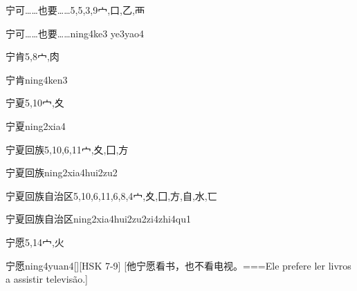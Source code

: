 \begin{Entry}{宁可……也要……}{5,5,3,9}{⼧,⼝,⼄,⾑}
  \begin{Phonetics}{宁可……也要……}{ning4ke3 ye3yao4}
  \end{Phonetics}
\end{Entry}

\begin{Entry}{宁肯}{5,8}{⼧,⾁}
  \begin{Phonetics}{宁肯}{ning4ken3}
  \end{Phonetics}
\end{Entry}

\begin{Entry}{宁夏}{5,10}{⼧,⼢}
  \begin{Phonetics}{宁夏}{ning2xia4}
  \end{Phonetics}
\end{Entry}

\begin{Entry}{宁夏回族}{5,10,6,11}{⼧,⼢,⼞,⽅}
  \begin{Phonetics}{宁夏回族}{ning2xia4hui2zu2}
  \end{Phonetics}
\end{Entry}

\begin{Entry}{宁夏回族自治区}{5,10,6,11,6,8,4}{⼧,⼢,⼞,⽅,⾃,⽔,⼖}
  \begin{Phonetics}{宁夏回族自治区}{ning2xia4hui2zu2zi4zhi4qu1}
  \end{Phonetics}
\end{Entry}

\begin{Entry}{宁愿}{5,14}{⼧,⽕}
  \begin{Phonetics}{宁愿}{ning4yuan4}[][HSK 7-9]
    [他宁愿看书，也不看电视。===Ele prefere ler livros a assistir televisão.]
  \end{Phonetics}
\end{Entry}

